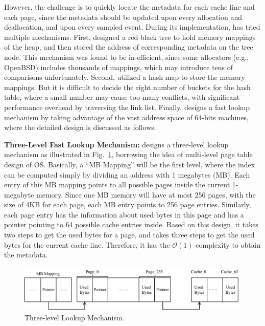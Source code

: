 However, the challenge is to quickly locate the  metadata for each cache line and each page, since the metadata should be updated upon every allocation and deallocation, and upon every sampled event. During its implementation, \MP{} has tried multiple mechanisms. First, \MP{} designed a red-black tree to hold memory mappings of the heap, and then stored the address of corresponding metadata on the tree node. This mechanism was found to be in-efficient, since some allocators (e.g., OpenBSD) includes thousands of mappings, which may introduce tens of comparisons unfortunately. Second, \MP{} utilized a hash map to store the memory mappings. But it is difficult to decide the right number of buckets for the hash table, where a small number may cause too many conflicts, with significant performance overhead by traversing the link list.  Finally, \MP{} designs a fast lookup mechanism by taking advantage of the vast address space of 64-bits machines, where the detailed design is discussed as follows. 


\textbf{Three-Level Fast Lookup Mechanism:} \MP{} designs a three-level lookup mechanism as illustrated in Fig.~\ref{fig:lookup}, borrowing the idea of multi-level page table design of OS. Basically, a ``MB Mapping'' will be the first level, where the index can be computed simply by dividing an address with 1 megabytes (MB). Each entry of this MB mapping points to all possible pages inside the current 1-megabyte memory. Since one MB memory will have at most 256 pages, with the size of 4KB for each page, each MB entry points to 256 page entries. Similarly, each page entry has the information about used bytes in this page and has a pointer pointing to 64 possible cache entries inside. Based on this design, it takes two steps to get the used bytes for a page, and takes three steps to get the used bytes for the current cache line. Therefore, it has the $\mathcal{O}(1)$ 
complexity to obtain the metadata.  
          
\begin{figure}[!h]
\centering
\includegraphics[width=5.5in]{figures/lookup}
\caption{Three-level Lookup Mechanism.\label{fig:lookup}}
\end{figure}

